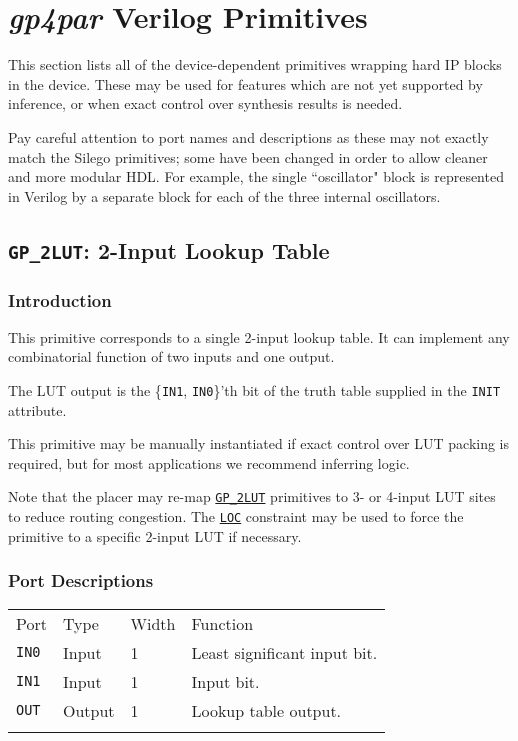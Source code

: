 \documentclass[11pt]{article}
\newcommand{\namestyle}[1]{\textit{#1}}
\newcommand{\tokenstyle}[1]{\texttt{#1}}
\newcommand{\whenstyle}[1]{{\fontseries{sb}\selectfont#1}}
\newcommand{\tokenref}[2]{\hyperref[#2]{\tokenstyle{#1}}}
\newcommand{\thinhline}{\Xhline{1\arrayrulewidth}}
\newcommand{\thickhline}{\Xhline{2.5\arrayrulewidth}}
\begin{document}
\pagebreak
\section{\namestyle{gp4par} Verilog Primitives}

This section lists all of the device-dependent primitives wrapping hard IP blocks in the device. These may be used for
features which are not yet supported by inference, or when exact control over synthesis results is needed.

Pay careful attention to port names and descriptions as these may not exactly match the Silego primitives; some have
been changed in order to allow cleaner and more modular HDL. For example, the single ``oscillator" block is represented
in Verilog by a separate block for each of the three internal oscillators.


\pagebreak
\subsection{\tokenstyle{GP\_2LUT}: 2-Input Lookup Table}
\label{gp-2lut}

\subsubsection{Introduction}
This primitive corresponds to a single 2-input lookup table. It can implement any combinatorial function of two
inputs and one output.

The LUT output is the \{\tokenstyle{IN1}, \tokenstyle{IN0}\}'th bit of the truth table supplied in the \tokenstyle{INIT} attribute.

This primitive may be manually instantiated if exact control over LUT packing is required, but for most applications we
recommend inferring logic.

Note that the placer may re-map \tokenref{GP\_2LUT}{gp-2lut} primitives to 3- or 4-input LUT sites to reduce routing 
congestion. The \tokenref{LOC}{LOC} constraint may be used to force the primitive to a specific 2-input LUT if 
necessary.

\subsubsection{Port Descriptions}

\begin{tabularx}{\textwidth}{lllX}
\thinhline
\whenstyle{Port} & \whenstyle{Type} & \whenstyle{Width} & \whenstyle{Function} \\
\thickhline
\tokenstyle{IN0} & Input & 1 & Least significant input bit. \\
\thinhline
\tokenstyle{IN1} & Input & 1 & Input bit. \\
\thinhline
\tokenstyle{OUT} & Output & 1 & Lookup table output. \\
\thinhline
\end{tabularx}
\end{document}
